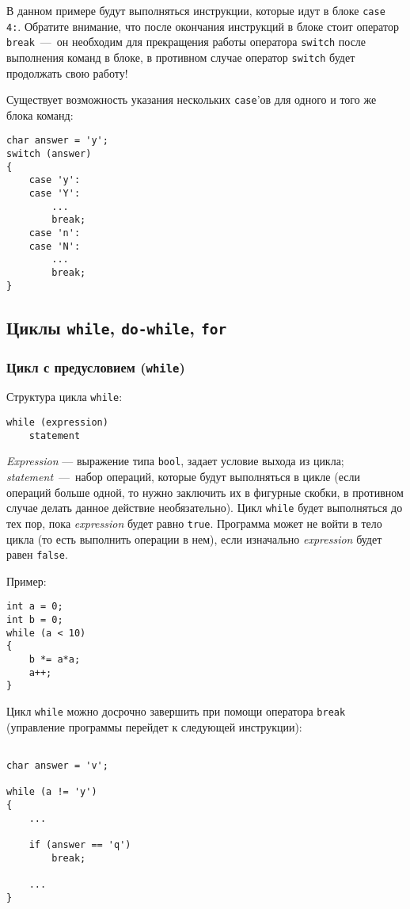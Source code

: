 В данном примере будут выполняться инструкции, которые идут в блоке \lstinline|case 4:|. Обратите внимание, что после окончания инструкций в блоке стоит оператор \lstinline|break|~---~он необходим для прекращения работы оператора \lstinline|switch| после выполнения команд в блоке, в противном случае оператор \lstinline|switch| будет продолжать свою работу!

Существует возможность указания нескольких \lstinline|case|'ов для одного и того же блока команд:

\begin{lstlisting}
char answer = 'y';
switch (answer)
{
    case 'y':
    case 'Y':
        ...
        break;
    case 'n':
    case 'N':
        ...
        break;
}
\end{lstlisting}

\subsection{Циклы \texttt{while}, \texttt{do-while}, \texttt{for}}
\subsubsection{Цикл с предусловием (\texttt{while})}
Структура цикла \lstinline|while|:
\begin{lstlisting}
while (expression)
    statement
\end{lstlisting}

\textit{Expression} --- выражение типа \lstinline|bool|, задает условие выхода из цикла; \textit{statement}~---~набор операций, которые будут выполняться в цикле (если операций больше одной, то нужно заключить их в фигурные скобки, в противном случае делать данное действие необязательно). Цикл \lstinline|while| будет выполняться до тех пор, пока \textit{expression} будет равно \lstinline|true|. Программа может не войти в тело цикла (то есть выполнить операции в нем), если изначально \textit{expression} будет равен \lstinline|false|.

Пример:

\begin{lstlisting}
int a = 0;
int b = 0;
while (a < 10)
{
    b *= a*a;
    a++;
}
\end{lstlisting}

Цикл \lstinline|while| можно досрочно завершить при помощи оператора \lstinline|break| (управление программы перейдет к следующей инструкции):

\begin{lstlisting}

char answer = 'v';

while (a != 'y')
{
    ...

    if (answer == 'q')
        break;

    ...
}

\end{lstlisting}

